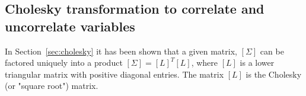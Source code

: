 %	
%	
%	

\subsection{Cholesky transformation to correlate and uncorrelate variables}
In Section~\ref{sec:cholesky} it has been shown that a given matrix, $[\Sigma]$ can be factored uniquely into a product $[\Sigma]=[L]^T [L]$, where $[L]$ is a lower triangular matrix with positive diagonal entries. The matrix $[L]$ is the Cholesky (or "square root") matrix.

